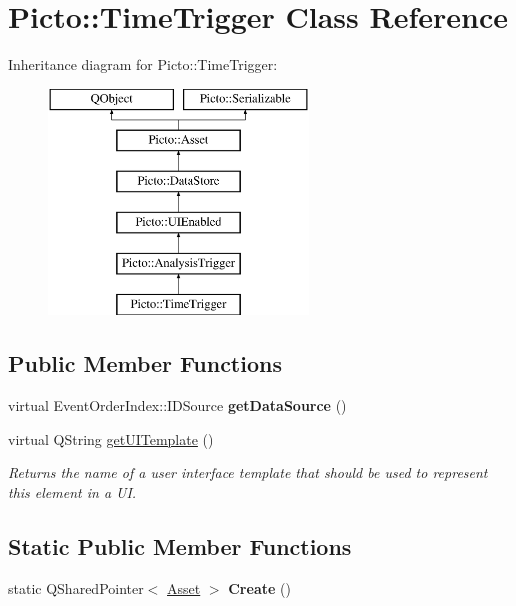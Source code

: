 \hypertarget{class_picto_1_1_time_trigger}{\section{Picto\-:\-:Time\-Trigger Class Reference}
\label{class_picto_1_1_time_trigger}
}
Inheritance diagram for Picto\-:\-:Time\-Trigger\-:\begin{figure}[H]
\begin{center}
\leavevmode
\includegraphics[height=6.000000cm]{class_picto_1_1_time_trigger}
\end{center}
\end{figure}
\subsection*{Public Member Functions}
\begin{DoxyCompactItemize}
\item 
\hypertarget{class_picto_1_1_time_trigger_ad19458c6259c206be178008fe128ddce}{virtual Event\-Order\-Index\-::\-I\-D\-Source {\bfseries get\-Data\-Source} ()}\label{class_picto_1_1_time_trigger_ad19458c6259c206be178008fe128ddce}

\item 
\hypertarget{class_picto_1_1_time_trigger_a22455c38012588f909b6ecc4dd6e500c}{virtual Q\-String \hyperlink{class_picto_1_1_time_trigger_a22455c38012588f909b6ecc4dd6e500c}{get\-U\-I\-Template} ()}\label{class_picto_1_1_time_trigger_a22455c38012588f909b6ecc4dd6e500c}

\begin{DoxyCompactList}\small\item\em Returns the name of a user interface template that should be used to represent this element in a U\-I. \end{DoxyCompactList}\end{DoxyCompactItemize}
\subsection*{Static Public Member Functions}
\begin{DoxyCompactItemize}
\item 
\hypertarget{class_picto_1_1_time_trigger_a2bec25ec5adce15fe50a5c512e8ae1aa}{static Q\-Shared\-Pointer$<$ \hyperlink{class_picto_1_1_asset}{Asset} $>$ {\bfseries Create} ()}\label{class_picto_1_1_time_trigger_a2bec25ec5adce15fe50a5c512e8ae1aa}

\end{DoxyCompactItemize}
